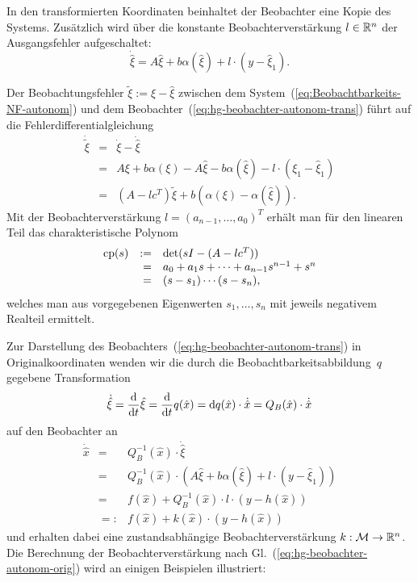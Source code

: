 In den transformierten Koordinaten beinhaltet der Beobachter eine
Kopie des Systems. Zusätzlich wird über die konstante Beobachterverstärkung
$l\in{\mathbb{R}}^{n}$ der Ausgangsfehler aufgeschaltet:
\begin{equation}
\dot{\hat{\xi}}=A\hat{\xi}+b\alpha(\hat{\xi})+l\cdot(y-\hat{\xi}_{1}).\label{eq:hg-beobachter-autonom-trans}
\end{equation}

Der Beobachtungsfehler $\tilde{\xi}:=\xi-\hat{\xi}$ zwischen dem
System~(\ref{eq:Beobachtbarkeits-NF-autonom}) und dem Beobachter~(\ref{eq:hg-beobachter-autonom-trans})
führt auf die Fehlerdifferentialgleichung
\begin{equation}
\begin{array}{ccl}
\dot{\tilde{\xi}} & = & \dot{\xi}-\dot{\hat{\xi}}\\
 & = & A\xi+b\alpha(\xi)-A\hat{\xi}-b\alpha(\hat{\xi})-l\cdot(\xi_{1}-\hat{\xi}_{1})\\
 & = & \left(A-lc^{T}\right)\tilde{\xi}+b\left(\alpha(\xi)-\alpha(\hat{\xi})\right).
\end{array}\label{eq:hg-fehlerdyn}
\end{equation}
Mit der Beobachterverstärkung $l=(a_{n-1},\ldots,a_{0})^{T}$ erhält
man für den linearen Teil das charakteristische Polynom
\begin{equation}
\begin{array}{crl}
{\operatorname{cp}}(s) & := & \det(sI-(A-lc^{T}))\\
 & = & a_{0}+a_{1}s+\cdots+a_{n-1}s^{n-1}+s^{n}\\
 & = & (s-s_{1})\cdots(s-s_{n}),
\end{array}\label{eq:hg-cp}
\end{equation}
welches man aus vorgegebenen Eigenwerten $s_{1},\ldots,s_{n}$ mit
jeweils negativem Realteil ermittelt.

Zur Darstellung des Beobachters~(\ref{eq:hg-beobachter-autonom-trans})
in Originalkoordinaten wenden wir die durch die Beobachtbarkeitsabbildung~$q$
gegebene Transformation 
\[
\dot{\hat{\xi}}=\frac{{\mathrm{d}}}{{\mathrm{d}} t}\hat{\xi}=\frac{{\mathrm{d}}}{{\mathrm{d}} t}q(\hat{x})={\mathrm{d}} q(\hat{x})\cdot\dot{\hat{x}}=Q_{B}(\hat{x})\cdot\dot{\hat{x}}
\]
auf den Beobachter an
\begin{equation}
\begin{array}{cll}
\dot{\hat{x}} & = & Q_{B}^{-1}(\hat{x})\cdot\dot{\hat{\xi}}\\
 & = & Q_{B}^{-1}(\hat{x})\cdot\left(A\hat{\xi}+b\alpha(\hat{\xi})+l\cdot(y-\hat{\xi}_{1})\right)\\
 & = & f(\hat{x})+Q_{B}^{-1}(\hat{x})\cdot l\cdot(y-h(\hat{x}))\\
 & =: & f(\hat{x})+k(\hat{x})\cdot(y-h(\hat{x}))
\end{array}\label{eq:hg-beobachter-autonom-orig}
\end{equation}
und erhalten dabei eine zustandsabhängige Beobachterverstärkung $k:\mathcal{M}\to{\mathbb{R}}^{n}$.
Die Berechnung der Beobachterverstärkung nach Gl.~(\ref{eq:hg-beobachter-autonom-orig})
wird an einigen Beispielen illustriert:

